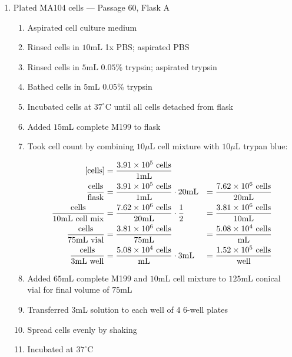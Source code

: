 \begin{enumerate}
	\item Plated MA104 cells --- Passage 60, Flask A
		\begin{enumerate}
			\item Aspirated cell culture medium
			\item Rinsed cells in $10$mL 1x PBS; aspirated PBS
			\item Rinsed cells in $5$mL $0.05$\% trypsin; aspirated trypsin
			\item Bathed cells in $5$mL $0.05$\% trypsin
			\item Incubated cells at $37^{\circ}$C until all cells detached from flask
			\item Added $15$mL complete M199 to flask
			\item Took cell count by combining $10\mu$L cell mixture with $10\mu$L trypan blue:
			
				\begin{align*}
				\text{[cells]} &= \frac{3.91\times 10^{5}\text{ cells}}{1\text{mL}} \\
				\frac{\text{cells}}{\text{flask}} &= \frac{3.91\times 10^{5}\text{ cells}}{1\text{mL}} \cdot 20\text{mL} &= \frac{7.62\times 10^{6}\text{ cells}}{20\text{mL}}\\
				\frac{\text{cells}}{10\text{mL cell mix}} &= \frac{7.62\times 10^{6}\text{ cells}}{20\text{mL}}\cdot \frac{1}{2} &= \frac{3.81\times 10^{6}\text{ cells}}{10\text{mL}}\\
				\frac{\text{cells}}{75\text{mL vial}} &= \frac{3.81\times 10^{6}\text{ cells}}{75\text{mL}} &= \frac{5.08\times 10^{4}\text{ cells}}{\text{mL}}\\
				\frac{\text{cells}}{3\text{mL well}} &= \frac{5.08\times 10^{4}\text{ cells}}{\text{mL}} \cdot 3\text{mL} &= \frac{1.52\times 10^{5}\text{ cells}}{\text{well}}\\
				\end{align*}
			\item Added $65$mL complete M199 and $10$mL cell mixture to $125$mL conical vial for final volume of $75$mL
			\item Transferred $3$mL solution to each well of 4 6-well plates
			\item Spread cells evenly by shaking
			\item Incubated at $37^{\circ}$C
		\end{enumerate}
\end{enumerate}